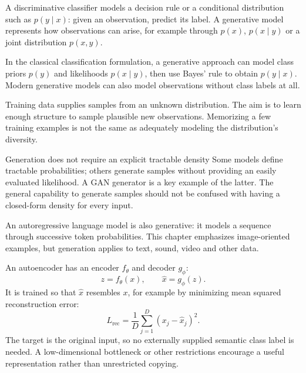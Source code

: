 \documentclass[11pt]{article}
\begin{document}
\tableofcontents\clearpage

A discriminative classifier models a decision rule or a conditional distribution such as $p(y\mid x)$: given an observation, predict its label. A generative model represents how observations can arise, for example through $p(x)$, $p(x\mid y)$ or a joint distribution $p(x,y)$.

In the classical classification formulation, a generative approach can model class priors $p(y)$ and likelihoods $p(x\mid y)$, then use Bayes' rule to obtain $p(y\mid x)$. Modern generative models can also model observations without class labels at all.

Training data supplies samples from an unknown distribution. The aim is to learn enough structure to sample plausible new observations. Memorizing a few training examples is not the same as adequately modeling the distribution's diversity.

\begin{keyidea}{Generation does not require an explicit tractable density}
Some models define tractable probabilities; others generate samples without providing an easily evaluated likelihood. A GAN generator is a key example of the latter. The general capability to generate samples should not be confused with having a closed-form density for every input.
\end{keyidea}

An autoregressive language model is also generative: it models a sequence through successive token probabilities. This chapter emphasizes image-oriented examples, but generation applies to text, sound, video and other data.

An autoencoder has an encoder $f_\theta$ and decoder $g_\phi$:
\[
z=f_\theta(x),\qquad \widehat{x}=g_\phi(z).
\]
It is trained so that $\widehat{x}$ resembles $x$, for example by minimizing mean squared reconstruction error:
\[
L_{\mathrm{rec}}=\frac1D\sum_{j=1}^{D}(x_j-\widehat{x}_j)^2.
\]
The target is the original input, so no externally supplied semantic class label is needed. A low-dimensional bottleneck or other restrictions encourage a useful representation rather than unrestricted copying.
\end{document}
